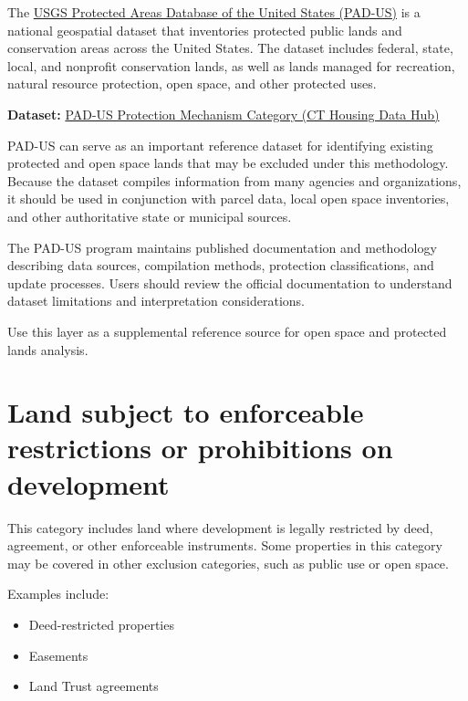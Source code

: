 \documentclass[
  letterpaper,
  DIV=11,
  numbers=noendperiod]{scrreprt}
\providecommand{\tightlist}{%
  \setlength{\itemsep}{0pt}\setlength{\parskip}{0pt}}
\begin{document}
The
\href{https://www.usgs.gov/programs/gap-analysis-project/science/pad-us-data-overview}{USGS
Protected Areas Database of the United States (PAD-US)} is a national
geospatial dataset that inventories protected public lands and
conservation areas across the United States. The dataset includes
federal, state, local, and nonprofit conservation lands, as well as
lands managed for recreation, natural resource protection, open space,
and other protected uses.

\textbf{Dataset:}
\href{https://housingmaps.ct.gov/datasets/USGS::pad-us-protection-mechanism-category/about}{PAD-US
Protection Mechanism Category (CT Housing Data Hub)}

PAD-US can serve as an important reference dataset for identifying
existing protected and open space lands that may be excluded under this
methodology. Because the dataset compiles information from many agencies
and organizations, it should be used in conjunction with parcel data,
local open space inventories, and other authoritative state or municipal
sources.

The PAD-US program maintains published documentation and methodology
describing data sources, compilation methods, protection
classifications, and update processes. Users should review the official
documentation to understand dataset limitations and interpretation
considerations.

Use this layer as a supplemental reference source for open space and
protected lands analysis.

\section{Land subject to enforceable restrictions or prohibitions on
development}\label{land-subject-to-enforceable-restrictions-or-prohibitions-on-development}

This category includes land where development is legally restricted by
deed, agreement, or other enforceable instruments. Some properties in
this category may be covered in other exclusion categories, such as
public use or open space.

Examples include:

\begin{itemize}
\tightlist
\item
  Deed-restricted properties
\item
  Easements
\item
  Land Trust agreements
\end{itemize}
\end{document}
